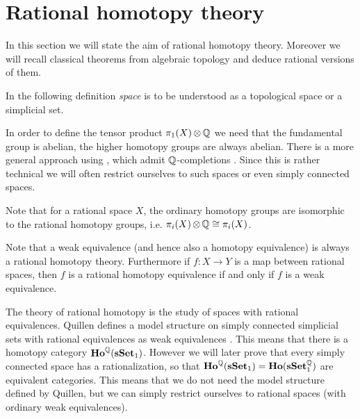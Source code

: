 
\chapter{Rational homotopy theory}
\label{sec:basics}

In this section we will state the aim of rational homotopy theory. Moreover we will recall classical theorems from algebraic topology and deduce rational versions of them.

In the following definition \emph{space} is to be understood as a topological space or a simplicial set.



In order to define the tensor product $\pi_1(X) \operatorname*{\otimes} \mathbb{Q}$ we need that the fundamental group is abelian, the higher homotopy groups are always abelian. There is a more general approach using , which admit $\mathbb{Q}$-completions \cite{bousfield}. Since this is rather technical we will often restrict ourselves to such spaces or even simply connected spaces.

Note that for a rational space $X$, the ordinary homotopy groups are isomorphic to the rational homotopy groups, i.e. $\pi_i(X) \operatorname*{\otimes} \mathbb{Q} \cong \pi_i(X)$.



Note that a weak equivalence (and hence also a homotopy equivalence) is always a rational homotopy theory. Furthermore if $f: X \to Y$ is a map between rational spaces, then $f$ is a rational homotopy equivalence if and only if $f$ is a weak equivalence.

The theory of rational homotopy is the study of spaces with rational equivalences. Quillen defines a model structure on simply connected simplicial sets with rational equivalences as weak equivalences \cite{quillen}. This means that there is a homotopy category $\mathbf{Ho}^{\mathbb{Q}}(\mathbf{s{\mathbf{Set}}}_1)$. However we will later prove that every simply connected space has a rationalization, so that $\mathbf{Ho}^{\mathbb{Q}}(\mathbf{s{\mathbf{Set}}}_1) = \mathbf{Ho}(\mathbf{s{\mathbf{Set}}}^{\mathbb{Q}}_1)$ are equivalent categories. This means that we do not need the model structure defined by Quillen, but we can simply restrict ourselves to rational spaces (with ordinary weak equivalences).


